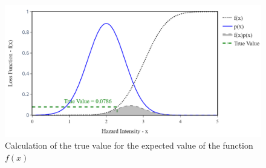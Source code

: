    \begin{figure}[H]
        \centering
        \includegraphics[scale=0.5]{Figures/Images/Illustrative Example/true_value.png}
        \caption{Calculation of the true value for the expected value of the function $f(x)$}
        \label{fig:true_value}
    \end{figure}